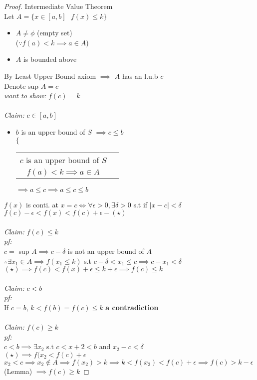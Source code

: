 \begin{proof}
Intermediate Value Theorem\\
Let $A = \{ x \in [a, b] \ \ \ f(x) \leq k\}$\\
\begin{itemize}
\item $A \neq \phi$ (empty set)\\
($\because f(a) < k \implies a \in A$)
\item $A$ is bounded above
\end{itemize}
By Least Upper Bound axiom $\implies$ $A$ has an l.u.b $c$\\
Denote sup $A = c$\\
\textit{want to show:} $f(c) = k$\\\\
\textit{Claim:} $c \in [a, b]$
\begin{itemize}
\item $b$ is an upper bound of $S$ $\implies c \leq b$\\
$\Big \{$
\begin{tabular}{cc}
$c$ is an upper bound of $S$ \\
$f(a) < k \implies a \in A$
\end{tabular}
$\implies a \leq c \implies a \leq c \leq b$\\
\end{itemize}
$f(x)$ is conti. at $x =c \Leftrightarrow \forall \epsilon > 0, \exists \delta > 0$ s.t if $\mid x -c \mid < \delta$\\
$f(c) - \epsilon < f(x) < f(c) + \epsilon - (\star)$\\\\
\textit{Claim:} $f(c) \leq k$\\
\textit{pf:}\\ 
$c =$ sup $A \implies c - \delta$ is not an upper bound of $A$\\
$\therefore \exists x_{1} \in A \implies f(x_{1} \leq k)$ s.t $c - \delta < x_{1} \leq c \implies c - x_{1} < \delta$\\
$(\star) \implies f(c) < f(x) + \epsilon \leq k + \epsilon \implies f(c) \leq k$\\\\
\textit{Claim:} $c < b$\\
\textit{pf:}\\
If $c = b$, \underline{$k < f(b) = f(c) \leq k$} \textbf{a contradiction}\\\\
\textit{Claim:} $f(c) \geq k$\\
\textit{pf:}\\
$c < b \implies \exists x_{2}$ s.t $c < x+{2} < b$ and $x_{2} - c < \delta$\\
$(\star) \implies f(x_{2} < f(c) + \epsilon$\\
$x_{2} < c \implies x_{2} \notin A \implies f(x_{2}) > k \implies k < f(x_{2}) < f(c) + \epsilon \implies f(c) > k - \epsilon$\\
(Lemma) $\implies f(c) \geq k$
\end{proof}
